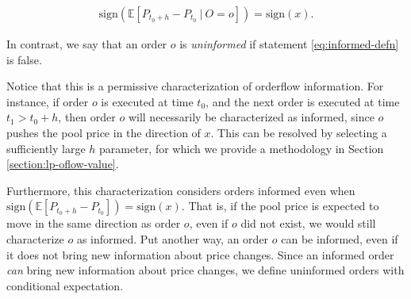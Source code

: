         \begin{align}
            \text{sign} \left ( \mathbb E [P_{t_0+h}-P_{t_0} \ | \ O=o]\right) = \text{sign} \left( x \right).
            \label{eq:informed-defn}
        \end{align}

        In contrast, we say that an order $o$ is \textit{uninformed} if statement \ref{eq:informed-defn} is false. 

        Notice that this is a permissive characterization of orderflow information. For instance, if order $o$ is executed at time $t_0$, and the next order is executed at time $t_1>t_0+h$, then order $o$ will necessarily be characterized as informed, since $o$ pushes the pool price in the direction of $x$. This can be resolved by selecting a sufficiently large $h$ parameter, for which we provide a methodology in Section \ref{section:lp-oflow-value}.

        Furthermore, this characterization considers orders informed even when $\text{sign} \left ( \mathbb E [P_{t_0+h}-P_{t_0}]\right) = \text{sign}(x)$. That is, if the pool price is expected to move in the same direction as order $o$, even if $o$ did not exist, we would still characterize $o$ as informed. Put another way, an order $o$ can be informed, even if it does not bring new information about price changes. Since an informed order \textit{can} bring new information about price changes, we define uninformed orders with conditional expectation.


        


